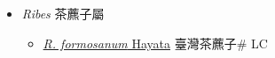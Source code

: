 
  \begin{itemize}
 \item[] \textit{Ribes} 茶藨子屬
                    
  \begin{itemize}
        \item[] \href{http://www.theplantlist.org/tpl1.1/search?q=Ribes+formosanum}{\textit{R. formosanum} Hayata}   臺灣茶藨子\# LC
  \end{itemize}
  \end{itemize}
